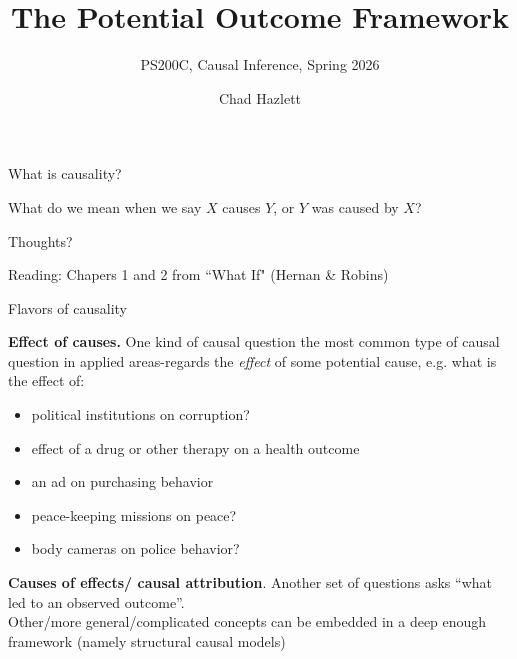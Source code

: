\documentclass[xcolor=dvipsnames]{beamer}
\title[]{The Potential Outcome Framework}
\subtitle[ ]{PS200C, Causal Inference, Spring 2026}
\author[Hazlett]{Chad Hazlett }
\institute[UCLA]{UCLA\\[1ex]
  \texttt{chazlett@ucla.edu}
}
\date{}
\begin{document}
\subject{Talks}


\begin{frame}
  \titlepage
\end{frame}

\begin{frame}{What is causality?}
\begin{center}
What do we mean when we say $X$ causes $Y$, or $Y$ was caused by $X$? \\

\bigskip
\bigskip

Thoughts?
\end{center}
\end{frame}


\begin{frame}
Reading: Chapers 1 and 2 from ``What If" (Hernan \& Robins)
\end{frame}

\begin{frame}{Flavors of causality}
  
 \textbf{Effect of causes.} One kind of causal question the most common type of causal question in applied areas-regards the \textit{effect} of some potential cause, e.g. what is the effect of:\\
\medskip
\footnotesize
\begin{itemize}
 \item political institutions on corruption?
 \item effect of a drug or other therapy on a health outcome
 \item an ad on purchasing behavior
 \item peace-keeping missions on peace?
 \item body cameras on police behavior?
\end{itemize}
\normalsize
{} \textbf{Causes of effects/ causal attribution}. Another set of questions asks ``what led to an observed outcome''.\\
\bigskip
{} Other/more general/complicated concepts can be embedded in a deep enough framework (namely structural causal models)
\end{frame}
\end{document}
